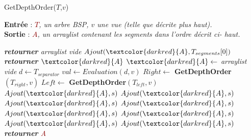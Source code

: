 \documentclass{article}
\newcommand{\red}[1]{\textcolor{darkred}{#1}}
\begin{document}
\begin{algorithm}
\caption{GetDepthOrder($T$,$v$)}
\textbf{Entrée} : \textit{\red{$T$}, un arbre BSP, $v$ une vue (telle que décrite plus haut).}\\
\textbf{Sortie} : \textit{\red{$A$}, un arraylist contenant les segments dans l'ordre décrit ci-
haut.}
\begin{algorithmic}
\STATE \textit{\textbf{retourner} arraylist vide}
\ELSE
		\STATE $Ajout(\red{A}, T_{segments}[0])$
		\STATE \textit{\textbf{retourner} $\red{A}$}
	\ELSE
		\STATE $\red{A} \leftarrow$ \textit{arraylist vide}
		\STATE $d \leftarrow T_{separator}$
		\STATE $val \leftarrow Evaluation(d,v)$
		\STATE $Right \leftarrow$ \textbf{GetDepthOrder}$(T_{right},v)$
		\STATE $Left \leftarrow$ \textbf{GetDepthOrder}$(T_{left},v)$
			\STATE $Ajout(\red{A},s)$
		\ENDFOR
			\STATE $Ajout(\red{A},s)$
		\ENDFOR
		\ELSE
					\STATE $Ajout(\red{A},s)$
				\ENDFOR
					\STATE $Ajout(\red{A},s)$
				\ENDFOR				
					\STATE $Ajout(\red{A},s)$
				\ENDFOR
			\ELSE
					\STATE $Ajout(\red{A},s)$
				\ENDFOR
				\STATE $Ajout(\red{A},s)$
				\ENDFOR				
					\STATE $Ajout(\red{A},s)$
				\ENDFOR
			\ENDIF
		\ENDIF
	\ENDIF
	\STATE \textit{\textbf{retourner} \red{A}}
\ENDIF
\end{algorithmic}
\end{algorithm}
\end{document}

